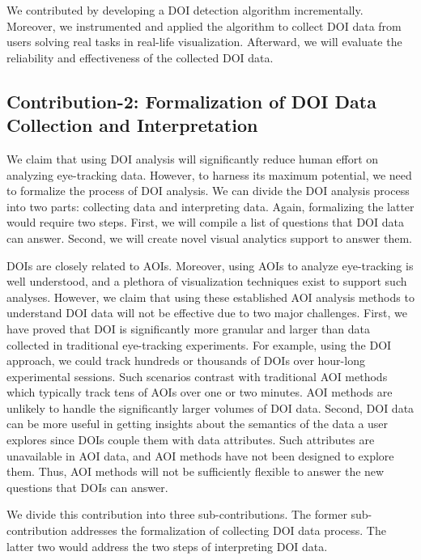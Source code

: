 We contributed by developing a DOI detection algorithm incrementally. Moreover, we instrumented and applied the algorithm to collect DOI data from users solving real tasks in real-life visualization. Afterward, we will evaluate the reliability and effectiveness of the collected DOI data.

\subsection{Contribution-2: Formalization of DOI Data Collection and Interpretation}
\label{sec:Contribution-2}

We claim that using DOI analysis will significantly reduce human effort on analyzing eye-tracking data. However, to harness its maximum potential, we need to formalize the process of DOI analysis. We can divide the DOI analysis process into two parts: collecting data and interpreting data. Again, formalizing the latter would require two steps. First, we will compile a list of questions that DOI data can answer. Second, we will create novel visual analytics support to answer them. 

DOIs are closely related to AOIs. Moreover, using AOIs to analyze eye-tracking is well understood, and a plethora of visualization techniques exist to support such analyses. However, we claim that using these established AOI analysis methods to understand DOI data will not be effective due to two major challenges. First, we have proved that DOI is significantly more granular and larger than data collected in traditional eye-tracking experiments. For example, using the DOI approach, we could track hundreds or thousands of DOIs over hour-long experimental sessions. Such scenarios contrast with traditional AOI methods which typically track tens of AOIs over one or two minutes. AOI methods are unlikely to handle the significantly larger volumes of DOI data. Second, DOI data can be more useful in getting insights about the semantics of the data a user explores since DOIs couple them with data attributes. Such attributes are unavailable in AOI data, and AOI methods have not been designed to explore them. Thus, AOI methods will not be sufficiently flexible to answer the new questions that DOIs can answer. 

We divide this contribution into three sub-contributions. The former sub-contribution addresses the formalization of collecting DOI data process. The latter two would address the two steps of interpreting DOI data.  

